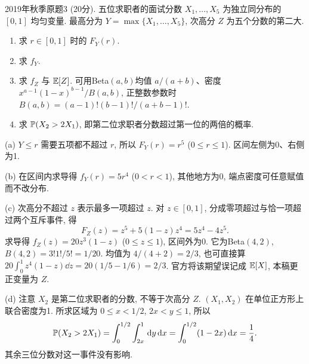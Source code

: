 \begin{exercise}\label{m2:2019f:q3}
2019年秋季原题3 (20分). 五位求职者的面试分数 $X_1,\ldots,X_5$ 为独立同分布的 $[0,1]$ 均匀变量. 最高分为 $Y=\max\{X_1,\ldots,X_5\}$, 次高分 $Z$ 为五个分数的第二大.
\begin{enumerate}
\item[(a)]\label{m2:2019f:q3:a} 求 $r\in[0,1]$ 时的 $F_Y(r)$.
\item[(b)]\label{m2:2019f:q3:b} 求 $f_Y$.
\item[(c)]\label{m2:2019f:q3:c} 求 $f_Z$ 与 $\mathbb E[Z]$. 可用Beta$(a,b)$均值 $a/(a+b)$、密度 $x^{a-1}(1-x)^{b-1}/B(a,b)$, 正整数参数时 $B(a,b)=(a-1)!(b-1)!/(a+b-1)!$.
\item[(d)]\label{m2:2019f:q3:d} 求 $\mathbb P(X_2>2X_1)$, 即第二位求职者分数超过第一位的两倍的概率.
\end{enumerate}
\end{exercise}
\begin{solution}
(a) $Y\le r$ 需要五项都不超过 $r$, 所以 $F_Y(r)=r^5$ ($0\le r\le1$). 区间左侧为0、右侧为1.

(b) 在区间内求导得 $f_Y(r)=5r^4$ ($0<r<1$), 其他地方为0, 端点密度可任意赋值而不改分布.

(c) 次高分不超过 $z$ 表示最多一项超过 $z$. 对 $z\in[0,1]$, 分成零项超过与恰一项超过两个互斥事件, 得
\[
F_Z(z)=z^5+5(1-z)z^4=5z^4-4z^5.
\]
求导得 $f_Z(z)=20z^3(1-z)$ ($0\le z\le1$), 区间外为0. 它为Beta$(4,2)$, $B(4,2)=3!1!/5!=1/20$. 均值为 $4/(4+2)=2/3$, 也可直接算 $20\int_0^1z^4(1-z)\dd z=20(1/5-1/6)=2/3$. 官方将该期望误记成 $\mathbb E[X]$, 本稿更正变量为 $Z$.

(d) 注意 $X_2$ 是第二位求职者的分数, 不等于次高分 $Z$. $(X_1,X_2)$ 在单位正方形上联合密度为1. 所求区域为 $0\le x<1/2$, $2x<y\le1$, 所以
\[
\mathbb P(X_2>2X_1)=\int_0^{1/2}\int_{2x}^1\,\mathrm d y\,\mathrm d x=\int_0^{1/2}(1-2x)\,\mathrm d x=\frac14.
\]
其余三位分数对这一事件没有影响.
\end{solution}

